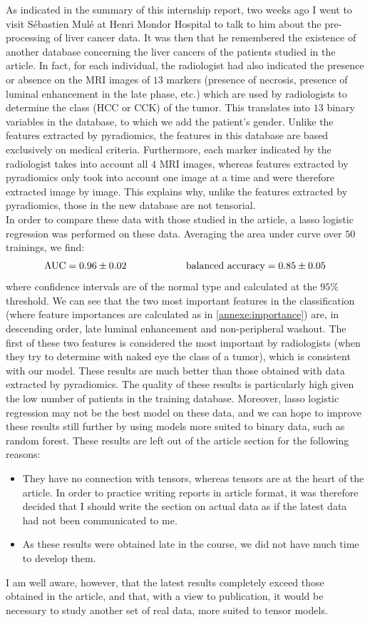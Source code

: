 \documentclass[preprint,12pt]{elsarticle}
\begin{document}
\noindent As indicated in the summary of this internship report, two weeks ago I went to visit Sébastien Mulé at Henri Mondor Hospital to talk to him about the pre-processing of liver cancer data. It was then that he remembered the existence of another database concerning the liver cancers of the patients studied in the article. In fact, for each individual, the radiologist had also indicated the presence or absence on the MRI images of $13$ markers (presence of necrosis, presence of luminal enhancement in the late phase, etc.) which are used by radiologists to determine the class (HCC or CCK) of the tumor. This translates into $13$ binary variables in the database, to which we add the patient's gender. Unlike the features extracted by pyradiomics, the features in this database are based exclusively on medical criteria. Furthermore, each marker indicated by the radiologist takes into account all $4$ MRI images, whereas features extracted by pyradiomics only took into account one image at a time and were therefore extracted image by image. This explains why, unlike the features extracted by pyradiomics, those in the new database are not tensorial.\\
\indent In order to compare these data with those studied in the article, a lasso logistic regression was performed on these data. Averaging the area under curve over $50$ trainings, we find:
$$
\text{AUC} = 0.96 \pm 0.02 \hspace{60 pt} \text{balanced accuracy} = 0.85 \pm 0.05
$$
where confidence intervals are of the normal type and calculated at the $95 \%$ threshold. We can see that the two most important features in the classification (where feature importances are calculated as in \ref{annexe:importance}) are, in descending order, late luminal enhancement and non-peripheral washout. The first of these two features is considered the most important by radiologists (when they try to determine with naked eye the class of a tumor), which is consistent with our model. These results are much better than those obtained with data extracted by pyradiomics. The quality of these results is particularly high given the low number of patients in the training database. Moreover, lasso logistic regression may not be the best model on these data, and we can hope to improve these results still further by using models more suited to binary data, such as random forest. These results are left out of the article section for the following reasons:
\begin{itemize}[label = $\bullet$]
    \item They have no connection with tensors, whereas tensors are at the heart of the article. In order to practice writing reports in article format, it was therefore decided that I should write the section on actual data as if the latest data had not been communicated to me.
    \item As these results were obtained late in the course, we did not have much time to develop them. 
\end{itemize}
I am well aware, however, that the latest results completely exceed those obtained in the article, and that, with a view to publication, it would be necessary to study another set of real data, more suited to tensor models.
\end{document}
